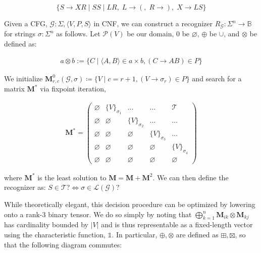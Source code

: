 \documentclass[sigplan,nonacm]{acmart}\settopmatter{printfolios=false,printccs=false,printacmref=false}
\begin{document}
\[
\{S\rightarrow XR \mid SS \mid LR,\; L \rightarrow (,\; R \rightarrow ),\; X\rightarrow LS\}
\]

Given a CFG, $\mathcal{G} : \Sigma, \langle V, P, S\rangle$ in CNF, we can construct a recognizer $R_\mathcal{G}: \Sigma^n \rightarrow \mathbb{B}$ for strings $\sigma: \Sigma^n$ as follows. Let $\mathcal P(V)$ be our domain, $0$ be $\varnothing$, $\oplus$ be $\cup$, and $\otimes$ be defined as:

\begin{align}
a \otimes b := \{C \mid \langle A, B\rangle \in a \times b, (C\rightarrow AB) \in P\}
\end{align}

\noindent We initialize $\mathbf{M}^0_{r,c}(\mathcal{G}, \sigma) \coloneqq \{V \mid c = r + 1, (V \rightarrow \sigma_r) \in P\}$ and search for a matrix $\mathbf{M}^*$ via fixpoint iteration,

\begin{align}
\mathbf{M}^* = \begin{pmatrix}
  \varnothing & \{V\}_{\sigma_1} & \ldots & \ldots & \mathcal{T} \\
  \varnothing & \varnothing & \{V\}_{\sigma_2} & \ldots & \ldots \\
  \varnothing & \varnothing & \varnothing & \{V\}_{\sigma_3} & \ldots \\
  \varnothing & \varnothing & \varnothing & \varnothing & \{V\}_{\sigma_4} \\
  \varnothing & \varnothing & \varnothing & \varnothing & \varnothing
\end{pmatrix}
\end{align}

\noindent where $\mathbf{M}^*$ is the least solution to $\mathbf{M} = \mathbf{M} + \mathbf{M}^2$. We can then define the recognizer as: $S \in \mathcal{T}? \iff \sigma \in \mathcal{L}(\mathcal{G})?$ %

While theoretically elegant, this decision procedure can be optimized by lowering onto a rank-3 binary tensor. We do so simply by noting that $\bigoplus_{k = 1}^n \mathbf{M}_{ik} \otimes \mathbf{M}_{kj}$ has cardinality bounded by $|V|$ and is thus representable as a fixed-length vector using the characteristic function, $\mathds{1}$. In particular, $\oplus, \otimes$ are defined as $\boxplus, \boxtimes$, so that the following diagram commutes:
\end{document}
